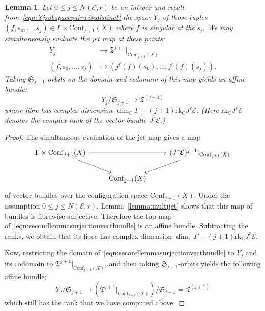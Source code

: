 \documentclass[a4paper]{amsart}
\newcommand{\bC}{\mathbb C}
\newcommand{\cE}{\mathcal E}
\newcommand{\fT}{\mathfrak T}
\newcommand{\lra}{\longrightarrow}
\newcommand{\fS}{\mathfrak S}
\theoremstyle{plain}
\newtheorem{lemma}[theorem]{Lemma}
\theoremstyle{definition}
\newcommand{\Conf}{\mathrm{Conf}}
\newcommand{\rank}{\mathrm{rk}}
\begin{document}
\begin{lemma}\label{lemma:secondbundle}
Let $0 \leq j \leq N(\cE,r)$ be an integer and recall from~\eqref{eqn:Yjsubspacepairwisedistinct} the space $Y_j$ of those tuples $(f,s_0,\ldots,s_j) \in \Gamma \times \Conf_{j+1}(X)$ where $f$ is singular at the $s_i$. We may simultaneously evaluate the jet map at these points:
\begin{align*}
    Y_j &\lra \fT^{j+1}|_{\Conf_{j+1}(X)} \\
    (f,s_0,\ldots,s_j) &\longmapsto (j^r(f)(s_0), \ldots, j^r(f)(s_j)).
\end{align*}
Taking $\fS_{j+1}$-orbits on the domain and codomain of this map yields an affine bundle:
\[
    Y_j / \fS_{j+1} \lra \fT^{(j+1)}
\]
whose fibre has complex dimension $\dim_\bC \Gamma - (j+1) \rank_\bC J^r\cE$. (Here $\rank_\bC J^r\cE$ denotes the complex rank of the vector bundle $J^r\cE$.)
\end{lemma}
\begin{proof}
The simultaneous evaluation of the jet map gives a map
\begin{equation}\label{eqn:secondlemmasurjectionvectbundle}
\begin{tikzcd}
\Gamma \times \Conf_{j+1}(X) \arrow[rd] \arrow[rr] &                & (J^r\cE)^{j+1}|_{\Conf_{j+1}(X)} \arrow[ld] \\
                                                   & \Conf_{j+1}(X) &                                            
\end{tikzcd}
\end{equation}
of vector bundles over the configuration space $\Conf_{j+1}(X)$. Under the assumption $0 \leq j \leq N(\cE,r)$, Lemma~\ref{lemma:multijet} shows that this map of bundles is fibrewise surjective. Therefore the top map of~\eqref{eqn:secondlemmasurjectionvectbundle} is an affine bundle. Subtracting the ranks, we obtain that its fibre has complex dimension $\dim_\bC \Gamma - (j+1)\rank_\bC J^r\cE$.

Now, restricting the domain of~\eqref{eqn:secondlemmasurjectionvectbundle} to $Y_j$ and its codomain to $\fT^{j+1}|_{\Conf_{j+1}(X)}$, and then taking $\fS_{j+1}$-orbits yields the following affine bundle:
\[
    Y_j / \fS_{j+1} \lra \left( \fT^{j+1}|_{\Conf_{j+1}(X)} \right) / \fS_{j+1} = \fT^{(j+1)}
\]
which still has the rank that we have computed above.
\end{proof}
\end{document}
